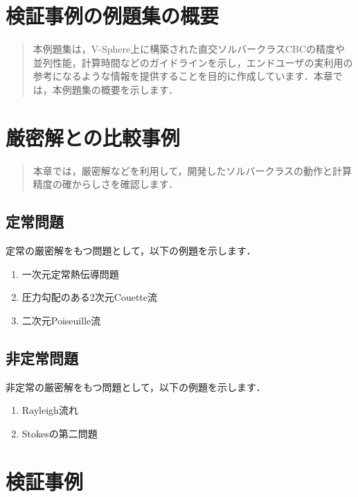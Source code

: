 \documentclass[a4paper,10pt,oneside,fleqn]{jsbook}
\begin{document}
\chapter{検証事例の例題集の概要}
{\begin{abstract}
本例題集は，V-Sphere上に構築された直交ソルバークラスCBCの精度や並列性能，計算時間などのガイドラインを示し，エンドユーザの実利用の参考になるような情報を提供することを目的に作成しています．本章では，本例題集の概要を示します．
\end{abstract}
\pagebreak
%





\chapter{厳密解との比較事例}
{\begin{abstract}
本章では，厳密解などを利用して，開発したソルバークラスの動作と計算精度の確からしさを確認します．
\end{abstract}
\pagebreak

\section{定常問題}
定常の厳密解をもつ問題として，以下の例題を示します．
\begin{enumerate}
\item 一次元定常熱伝導問題
\item 圧力勾配のある2次元Couette流
\item 二次元Poiseuille流
\end{enumerate}







\section{非定常問題}
非定常の厳密解をもつ問題として，以下の例題を示します．
\begin{enumerate}
\item Rayleigh流れ
\item Stokesの第二問題
\end{enumerate}

%
%




\chapter{検証事例}
\label{chpt:validation}

}}
\end{document}
